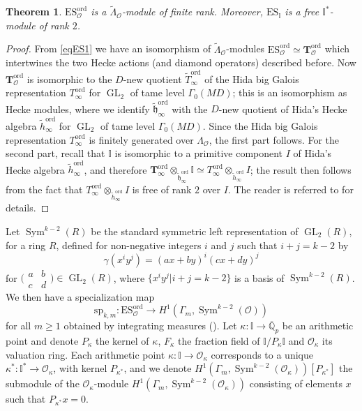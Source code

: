 \documentclass[a4paper,11pt]{amsart}
\numberwithin{equation}{section}
\theoremstyle{plain}
\newtheorem{theorem}{Theorem}[section]
\theoremstyle{definition}
\theoremstyle{remark}
\newcommand{\Q}{\mathbb{Q}}
\newcommand{\I}{\mathbb{I}}
\DeclareMathOperator{\GL}{GL}
\DeclareMathOperator{\Sym}{Sym}
\newcommand{\ord}{\mathrm{ord}}
\newcommand{\ES}{\mathrm{ES}}
\newcommand{\smallmat}[4]{\bigl(\begin{smallmatrix}#1&#2\\#3&#4\end{smallmatrix}\bigr)}
\begin{document}
\begin{theorem}\label{thm1.2}
$\ES_\mathcal{O}^\ord$ is a $\widetilde{\Lambda}_\mathcal{O}$-module of finite rank. 
Moreover, $\ES_\I$ is a free $\I^*$-module of rank $2$.
\end{theorem}

\begin{proof} 
From \eqref{eqES1} we have an isomorphism of $\widetilde{\Lambda}_\mathcal{O}$-modules 
$\ES_\mathcal{O}^\ord\simeq\mathbf{T}_\mathcal{O}^\ord$ which intertwines the two Hecke actions (and diamond operators) described before.
Now $\mathbf{T}_\mathcal{O}^\ord$ is isomorphic to the $D$-new quotient $\widetilde T_\infty^\ord$ 
of the Hida big Galois representation $T_\infty^\ord$ for $\GL_2$ of tame level $\Gamma_0(MD)$; this is an isomorphism as Hecke modules, where we identify $\tilde{\mathfrak{h}}_\infty^\ord$ 
with the $D$-new quotient of Hida's Hecke algebra $\tilde h_\infty^\ord$ for $\GL_2$ of tame level $\Gamma_0(MD)$. 
Since the Hida big Galois representation $T_\infty^\ord$ is finitely generated over $\Lambda_\mathcal{O}$, the first part follows. For the second part, recall that $\I$ is isomorphic to a primitive component $I$ of Hida's Hecke algebra $\tilde h_\infty^\ord$, and therefore $\mathbf{T}_\infty^\ord\otimes_{\tilde{\mathfrak{h}}_\infty^\ord}\I\simeq T_\infty^\ord\otimes_{\tilde{h}_\infty^\ord}I$; the result then follows from the fact that
$T_\infty^\ord\otimes_{\tilde{h}_\infty^\ord}I$ is free of rank $2$ over $I$. 
The reader is referred to \cite[Proposition 6.4]{LV-MM} for details. 
\end{proof}

Let $\Sym^{k-2}(R)$ be the standard symmetric left representation of $\GL_2(R)$, for a ring $R$, defined for non-negative integers $i$ and $j$ such that $i+j=k-2$ by  \[\gamma (x^iy^j)=(ax+by)^i(cx+dy)^j\] 
for $\smallmat abcd\in\GL_2(R)$, where $\{x^iy^j|i+j=k-2\}$ is a basis of $\Sym^{k-2}(R)$.
We then have a specialization map 
\begin{equation}\label{specmap}
\mathrm{sp}_{k,m}\colon \ES_\mathcal{O}^\ord\longrightarrow H^1(\Gamma_m,\Sym^{k-2}(\mathcal{O}))\end{equation} 
for all $m\geq 1$ obtained by integrating measures (\cite[\S2.5]{LV-IJNT}). 
Let $\kappa\colon \I\rightarrow\overline{\Q}_p$ be an arithmetic point and 
denote $P_\kappa$ the kernel of $\kappa$, $F_\kappa$ the fraction field of $\I/P_\kappa\I$ and $\mathcal{O}_\kappa$ its valuation ring. Each arithmetic point $\kappa\colon \I\rightarrow \mathcal{O}_\kappa$ corresponds to a unique 
$\kappa^*\colon \I^*\rightarrow\mathcal{O}_\kappa$, with kernel $P_{\kappa^*}$, and we 
denote $H^1(\Gamma_m,\Sym^{k-2}(\mathcal{O}_\kappa))[P_{{\kappa}^*}]$ the submodule of the $\mathcal{O}_\kappa$-module $H^1(\Gamma_m,\Sym^{k-2}(\mathcal{O}_\kappa))$ consisting of elements
$x$ such that $P_{{\kappa^*}}x=0$. 
\end{document}
